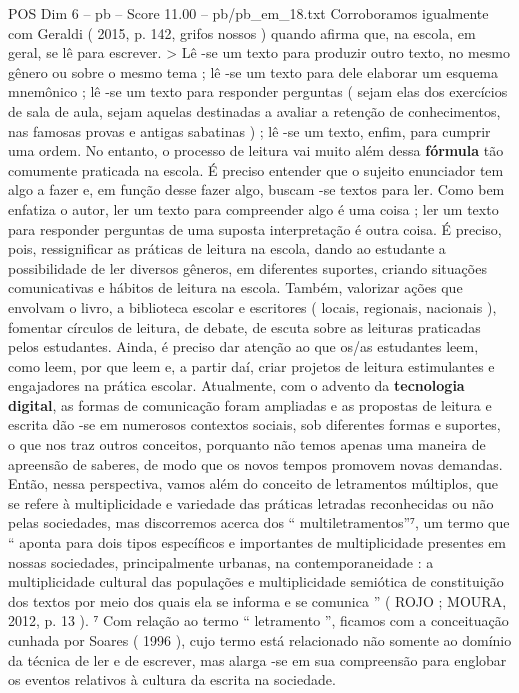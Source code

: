 \begin{textsample}{POS Dim 6 – pb – Score 11.00 – pb/pb\_em\_18.txt}
Corroboramos igualmente com Geraldi ( 2015, p. 142, grifos nossos ) quando afirma que, na escola, em geral, se lê para escrever. > Lê -se um texto para produzir outro texto, no mesmo gênero ou sobre o mesmo tema ; lê -se um texto para dele elaborar um esquema mnemônico ; lê -se um texto para responder perguntas ( sejam elas dos exercícios de sala de aula, sejam aquelas destinadas a avaliar a retenção de conhecimentos, nas famosas provas e antigas sabatinas ) ; lê -se um texto, enfim, para cumprir uma ordem.
No entanto, o processo de leitura vai muito além dessa \textbf{fórmula} tão comumente praticada na escola.
É preciso entender que o sujeito enunciador tem algo a fazer e, em função desse fazer algo, buscam -se textos para ler.
Como bem enfatiza o autor, ler um texto para compreender algo é uma coisa ; ler um texto para responder perguntas de uma suposta interpretação é outra coisa.
É preciso, pois, ressignificar as práticas de leitura na escola, dando ao estudante a possibilidade de ler diversos gêneros, em diferentes suportes, criando situações comunicativas e hábitos de leitura na escola.
Também, valorizar ações que envolvam o livro, a biblioteca escolar e escritores ( locais, regionais, nacionais ), fomentar círculos de leitura, de debate, de escuta sobre as leituras praticadas pelos estudantes.
Ainda, é preciso dar atenção ao que os/as estudantes leem, como leem, por que leem e, a partir daí, criar projetos de leitura estimulantes e engajadores na prática escolar.
Atualmente, com o advento da \textbf{tecnologia} \textbf{digital}, as formas de comunicação foram ampliadas e as propostas de leitura e escrita dão -se em numerosos contextos sociais, sob diferentes formas e suportes, o que nos traz outros conceitos, porquanto não temos apenas uma maneira de apreensão de saberes, de modo que os novos tempos promovem novas demandas.
Então, nessa perspectiva, vamos além do conceito de letramentos múltiplos, que se refere à multiplicidade e variedade das práticas letradas reconhecidas ou não pelas sociedades, mas discorremos acerca dos “ multiletramentos”⁷, um termo que “ aponta para dois tipos específicos e importantes de multiplicidade presentes em nossas sociedades, principalmente urbanas, na contemporaneidade : a multiplicidade cultural das populações e multiplicidade semiótica de constituição dos textos por meio dos quais ela se informa e se comunica ” ( ROJO ; MOURA, 2012, p. 13 ). ⁷ Com relação ao termo “ letramento ”, ficamos com a conceituação cunhada por Soares ( 1996 ), cujo termo está relacionado não somente ao domínio da técnica de ler e de escrever, mas alarga -se em sua compreensão para englobar os eventos relativos à cultura da escrita na sociedade.

\end{textsample}
